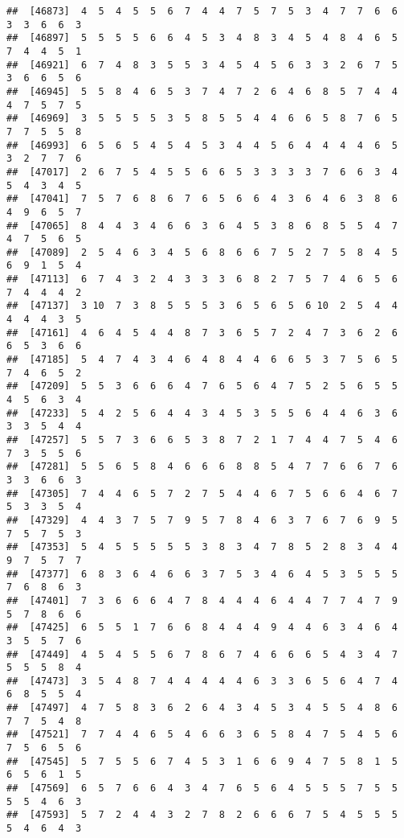 \documentclass[
]{book}
\begin{document}
\begin{verbatim}
##  [46873]  4  5  4  5  5  6  7  4  4  7  5  7  5  3  4  7  7  6  6  3  3  6  6  3
##  [46897]  5  5  5  5  6  6  4  5  3  4  8  3  4  5  4  8  4  6  5  7  4  4  5  1
##  [46921]  6  7  4  8  3  5  5  3  4  5  4  5  6  3  3  2  6  7  5  3  6  6  5  6
##  [46945]  5  5  8  4  6  5  3  7  4  7  2  6  4  6  8  5  7  4  4  4  7  5  7  5
##  [46969]  3  5  5  5  5  3  5  8  5  5  4  4  6  6  5  8  7  6  5  7  7  5  5  8
##  [46993]  6  5  6  5  4  5  4  5  3  4  4  5  6  4  4  4  4  6  5  3  2  7  7  6
##  [47017]  2  6  7  5  4  5  5  6  6  5  3  3  3  3  7  6  6  3  4  5  4  3  4  5
##  [47041]  7  5  7  6  8  6  7  6  5  6  6  4  3  6  4  6  3  8  6  4  9  6  5  7
##  [47065]  8  4  4  3  4  6  6  3  6  4  5  3  8  6  8  5  5  4  7  4  7  5  6  5
##  [47089]  2  5  4  6  3  4  5  6  8  6  6  7  5  2  7  5  8  4  5  6  9  1  5  4
##  [47113]  6  7  4  3  2  4  3  3  3  6  8  2  7  5  7  4  6  5  6  7  4  4  4  2
##  [47137]  3 10  7  3  8  5  5  5  3  6  5  6  5  6 10  2  5  4  4  4  4  4  3  5
##  [47161]  4  6  4  5  4  4  8  7  3  6  5  7  2  4  7  3  6  2  6  6  5  3  6  6
##  [47185]  5  4  7  4  3  4  6  4  8  4  4  6  6  5  3  7  5  6  5  7  4  6  5  2
##  [47209]  5  5  3  6  6  6  4  7  6  5  6  4  7  5  2  5  6  5  5  4  5  6  3  4
##  [47233]  5  4  2  5  6  4  4  3  4  5  3  5  5  6  4  4  6  3  6  3  3  5  4  4
##  [47257]  5  5  7  3  6  6  5  3  8  7  2  1  7  4  4  7  5  4  6  7  3  5  5  6
##  [47281]  5  5  6  5  8  4  6  6  6  8  8  5  4  7  7  6  6  7  6  3  3  6  6  3
##  [47305]  7  4  4  6  5  7  2  7  5  4  4  6  7  5  6  6  4  6  7  5  3  3  5  4
##  [47329]  4  4  3  7  5  7  9  5  7  8  4  6  3  7  6  7  6  9  5  7  5  7  5  3
##  [47353]  5  4  5  5  5  5  5  3  8  3  4  7  8  5  2  8  3  4  4  9  7  5  7  7
##  [47377]  6  8  3  6  4  6  6  3  7  5  3  4  6  4  5  3  5  5  5  7  6  8  6  3
##  [47401]  7  3  6  6  6  4  7  8  4  4  4  6  4  4  7  7  4  7  9  5  7  8  6  6
##  [47425]  6  5  5  1  7  6  6  8  4  4  4  9  4  4  6  3  4  6  4  3  5  5  7  6
##  [47449]  4  5  4  5  5  6  7  8  6  7  4  6  6  6  5  4  3  4  7  5  5  5  8  4
##  [47473]  3  5  4  8  7  4  4  4  4  4  6  3  3  6  5  6  4  7  4  6  8  5  5  4
##  [47497]  4  7  5  8  3  6  2  6  4  3  4  5  3  4  5  5  4  8  6  7  7  5  4  8
##  [47521]  7  7  4  4  6  5  4  6  6  3  6  5  8  4  7  5  4  5  6  7  5  6  5  6
##  [47545]  5  7  5  5  6  7  4  5  3  1  6  6  9  4  7  5  8  1  5  6  5  6  1  5
##  [47569]  6  5  7  6  6  4  3  4  7  6  5  6  4  5  5  5  7  5  5  5  5  4  6  3
##  [47593]  5  7  2  4  4  3  2  7  8  2  6  6  6  7  5  4  5  5  5  5  4  6  4  3

\end{verbatim}
\end{document}
